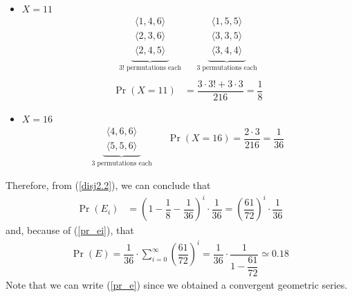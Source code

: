 \begin{itemize}

	\item $X = 11$
	\begin{align*}
		\underbrace{
			\begin{aligned}
				\langle 1,4,6 \rangle\\
				\langle 2,3,6 \rangle\\
				\langle 2,4,5 \rangle
			\end{aligned}
		}_{\text{3! permutations each}}
		&&\underbrace{
			\begin{aligned}
				\langle 1,5,5 \rangle\\
				\langle 3,3,5 \rangle\\
				\langle 3,4,4 \rangle
			\end{aligned}
		}_{\text{3 permutations each}}\\
	\end{align*}
	\begin{align*}
		\Pr(X = 11) &= \dfrac{3 \cdot 3! + 3 \cdot 3}{216} = \dfrac{1}{8}
	\end{align*}
	
	\item $X = 16$
	\begin{align*}
		\underbrace{
			\begin{aligned}
				\langle 4,6,6 \rangle\\
				\langle 5,5,6 \rangle
			\end{aligned}
		}_{\text{3 permutations each}}
		&&\Pr(X = 16) = \dfrac{2 \cdot 3}{216} = \dfrac{1}{36}
	\end{align*}

\end{itemize}
Therefore, from (\ref{disj2.2}), we can conclude that
\begin{align}
	\Pr(E_i) &= \left( 1 - \dfrac{1}{8} - \dfrac{1}{36} \right)^i \cdot \dfrac{1}{36} = \left( \dfrac{61}{72} \right)^i \cdot \dfrac{1}{36} \label{pr_ei}
\end{align}
and, because of (\ref{pr_ei}), that
\begin{align}
	\Pr(E) = \dfrac{1}{36} \cdot \sum_{i = 0}^{\infty}\left( \dfrac{61}{72} \right)^i = \dfrac{1}{36} \cdot \dfrac{1}{1 - \dfrac{61}{72}} \simeq 0.18 \label{pr_e}
\end{align}
Note that we can write (\ref{pr_e}) since we obtained a convergent geometric series.\\
